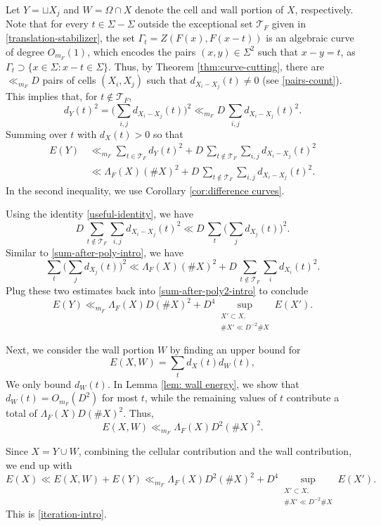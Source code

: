 \documentclass{amsart}%
\numberwithin{equation}{section}
\newcommand{\cT}{{\mathcal T}}
\newcommand{\1}{\mathbbm{1}}
\begin{document}
Let $Y=\sqcup X_j$ and $W=\Omega\cap X$ denote the cell and wall portion of $X$, respectively.
Note that for every $t\in\Sigma-\Sigma$ outside the exceptional set $\mathcal T_F$ given in \eqref{translation-stabilizer}, the set $\Gamma_t=Z(F(x), F(x-t))$ is an algebraic curve of degree $O_{m_F}(1)$, which encodes the pairs $(x,y)\in\Sigma^2$ such that $x-y=t$, as $\Gamma_t\supset\{x\in\Sigma: x-t\in\Sigma\}$.
Thus, by Theorem \ref{thm:curve-cutting}, there are $\ll_{m_F}D$ pairs of cells $(X_i, X_j)$ such that $d_{X_i-X_j}(t)\not=0$ (see \eqref{pairs-count}).
This implies that, for $t\not\in\cT_F$,
\begin{equation}
\label{sum-after-poly-intro}
    d_{Y}(t)^2=\Big(\sum_{i,j}d_{X_i-X_j}(t)\Big)^2\ll_{m_F}D\,\sum_{i,j}d_{X_i-X_j}(t)^2.
\end{equation}
Summing over $t$ with $d_{X}(t)>0$ so that
\begin{align}
\nonumber
    E(Y)\, &\ll_{m_F} \sum_{t\in\cT_F}d_Y(t)^2+D\,\sum_{t\not\in\cT_F}\sum_{i,j}d_{X_i-X_j}(t)^2\\ \label{sum-after-poly2-intro}
    &\ll  \Lambda_{F}(X)(\#X)^2+D\,\sum_{t\not\in\cT_F}\sum_{i,j}d_{X_i-X_j}(t)^2.
\end{align}
In the second inequality, we use Corollary \ref{cor:difference curves}.

Using the identity \eqref{useful-identity}, we have
\[
    D\,\sum_{t\not\in\cT_F}\sum_{i,j}d_{X_i-X_j}(t)^2\ll D\,\sum_t\Big(\sum_j d_{X_j}(t)\Big)^2.
\]
Similar to \eqref{sum-after-poly-intro}, we have
\[
    \sum_t\Big(\sum_j d_{X_j}(t)\Big)^2\ll \Lambda_{F}(X)(\#X)^2+D\,\sum_{t\not\in\cT_F}\sum_{i}d_{X_i}(t)^2.
\]
Plug these two estimates back into \eqref{sum-after-poly2-intro} to conclude
\[
    E(Y)\ll_{m_F} \Lambda_{F}(X)D(\#X)^2+D^4\sup_{\substack{X'\subset X,\\
    \#X'\ll D^{-2}\#X}}E(X').
\]

\medskip

Next, we consider the wall portion $W$ by finding an upper bound for 
\[
    E(X,W)=\sum_t d_X(t)d_W(t),
\] 
We only bound $d_W(t)$.
In Lemma \ref{lem: wall energy}, we show that $d_W(t)=O_{m_F}(D^2)$ for most $t$, while the remaining values of $t$ contribute a total of $\Lambda_{F}(X)D(\#X)^2$.
Thus, 
\[
    E(X,W)\ll_{m_F}\Lambda_{F}(X)D^2(\#X)^2.
\] 


Since $X=Y\cup W$, combining the cellular contribution and the wall contribution, we end up with
\[
    E(X)\ll E(X,W)+E(Y)\ll_{m_F} \Lambda_{F}(X)D^2(\#X)^2+D^4\sup_{\substack{X'\subset X,\\
    \#X'\ll D^{-2}\#X}}E(X').
\]
This is \eqref{iteration-intro}. 
\end{document}
